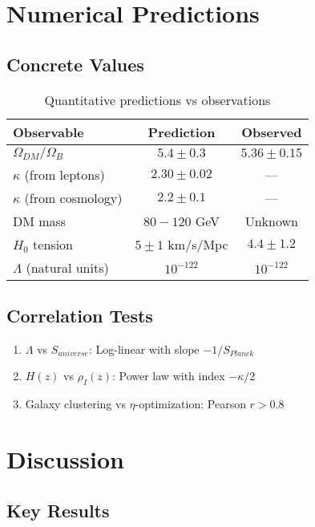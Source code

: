 \documentclass[11pt]{article}
\theoremstyle{plain}
\theoremstyle{definition}
\begin{document}
\section{Numerical Predictions}
\label{sec:numerical}

\subsection{Concrete Values}

\begin{table}[h]
  \centering
  \begin{tabular}{|l|c|c|}
    \hline
    \textbf{Observable} & \textbf{Prediction} & \textbf{Observed} \\
    \hline
    $\Omega_{DM}/\Omega_B$ & $5.4 \pm 0.3$ & $5.36 \pm 0.15$ \\
    $\kappa$ (from leptons) & $2.30 \pm 0.02$ & — \\
    $\kappa$ (from cosmology) & $2.2 \pm 0.1$ & — \\
    DM mass & $80-120$ GeV & Unknown \\
    $H_0$ tension & $5 \pm 1$ km/s/Mpc & $4.4 \pm 1.2$ \\
    $\Lambda$ (natural units) & $10^{-122}$ & $10^{-122}$ \\
    \hline
  \end{tabular}
  \caption{Quantitative predictions vs observations}
\end{table}

\subsection{Correlation Tests}

\begin{enumerate}
  \item $\Lambda$ vs $S_{universe}$: Log-linear with slope $-1/S_{Planck}$
  \item $H(z)$ vs $\rho_I(z)$: Power law with index $-\kappa/2$
  \item Galaxy clustering vs $\eta$-optimization: Pearson $r > 0.8$
\end{enumerate}

\section{Discussion}
\label{sec:discussion}

\subsection{Key Results}
\end{document}
